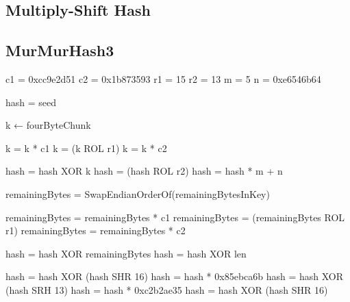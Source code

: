 \documentclass[11pt,oneside,a4paper]{article}
\begin{document}
\begin{appendices}
\subsection{Multiply-Shift Hash}
\begin{algorithm}[H]
\begin{algorithmic}[1]



\EndFunction
\end{algorithmic}


\end{algorithm}



\subsection{MurMurHash3}
\begin{algorithm}[H]
\begin{algorithmic}[1]

    \State c1 = 0xcc9e2d51
    \State c2 = 0x1b873593
    \State r1 = 15
    \State r2 = 13
   \State  m = 5
    \State n = 0xe6546b64

    \State hash  =  seed

         \State  k ← fourByteChunk

          \State k = k * c1
          \State k = (k ROL r1)
          \State k = k * c2

          \State hash = hash XOR k
          \State hash = (hash ROL r2)
          \State hash = hash * m + n
	\EndFor        
	

   	 

  \State      remainingBytes = SwapEndianOrderOf(remainingBytesInKey)

         \State  remainingBytes = remainingBytes * c1
          \State remainingBytes = (remainingBytes ROL r1)
          \State remainingBytes = remainingBytes * c2

         \State  hash = hash XOR remainingBytes
\EndFor
      \State hash = hash XOR len

     \State  hash = hash XOR (hash SHR 16)
      \State hash = hash * 0x85ebca6b
      \State hash = hash XOR (hash SRH 13)
      \State hash = hash * 0xc2b2ae35
      \State hash = hash XOR (hash SHR 16)
    \EndFunction
\end{algorithmic}
\end{algorithm}

\end{appendices}
\end{document}
